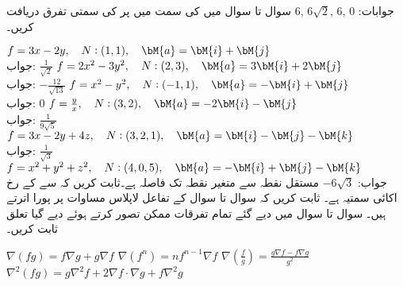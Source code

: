 جوابات:
$6,\,6\sqrt{2},\, 6,\, 0$
سوال  تا سوال  میں  کی سمت میں  پر  کی سمتی تفرق دریافت کریں۔

\quad
$f=3x-2y,\quad N:(1,1),\quad \bM{a}=\bM{i}+\bM{j}$\\
جواب:\quad
$\tfrac{1}{\sqrt{2}}$
\quad
$f=2x^2-3y^2,\quad N:(2,3),\quad \bM{a}=3\bM{i}+2\bM{j}$\\
جواب:\quad
$-\tfrac{12}{\sqrt{13}}$
\quad
$f=x^2-y^2,\quad N:(-1,1),\quad \bM{a}=-\bM{i}+\bM{j}$\\
جواب:\quad
$0$
\quad
$f=\frac{y}{x},\quad N:(3,2),\quad \bM{a}=-2\bM{i}-\bM{j}$\\
جواب:\quad
$\tfrac{1}{9\sqrt{5}}$
\quad
$f=3x-2y+4z,\quad N:(3,2,1),\quad \bM{a}=\bM{i}-\bM{j}-\bM{k}$\\
جواب:\quad
$\tfrac{1}{\sqrt{3}}$
\quad
$f=x^2+y^2+z^2,\quad N:(4,0,5),\quad \bM{a}=-\bM{i}+\bM{j}-\bM{k}$\\
جواب:\quad
$-6\sqrt{3}$
مستقل نقطہ  سے متغیر نقطہ  تک فاصلہ  ہے۔ثابت کریں کہ  سے   کے رخ اکائی سمتیہ   ہے۔  
ثابت کریں کہ سوال  تا سوال  کے تفاعل لاپلاس مساوات پر پورا اترتے ہیں۔
سوال  تا سوال  میں دیے گئے تمام تفرقات ممکن تصور کرتے ہوئے دیے گیا تعلق ثابت کریں۔

\quad
$\nabla(fg)=f\nabla g+g\nabla f$
\quad
$\nabla(f^n)=nf^{n-1}\nabla f$
\quad
$\nabla(\frac{f}{g})=\frac{g\nabla f-f\nabla g}{g^2}$
\quad
$\nabla^2(fg)=g\nabla^2f+2\nabla f\cdot \nabla g+f\nabla^2 g$


